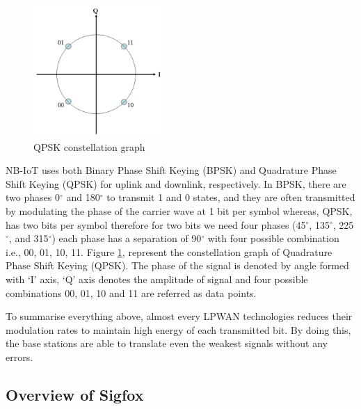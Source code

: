 \documentclass[12pt]{article}
\begin{document}
  \begin{figure}[H]
      \centering
      \includegraphics[width=0.5 \columnwidth, height=5cm, keepaspectratio
      ]{Images/QPSK.pdf}
      \caption{QPSK constellation graph}
      \label{fig:QPSK constellation graph}
  \end{figure}
  NB-IoT uses both Binary Phase Shift Keying (BPSK) and Quadrature Phase Shift Keying (QPSK) for uplink and downlink, respectively. In BPSK, there are two phases 0$^{\circ}$ and 180$^{\circ}$ to transmit 1 and 0 states, and they are often transmitted by modulating the phase of the carrier wave at 1 bit per symbol whereas, QPSK, has two bits per symbol therefore for two bits we need four phases (45$^{\circ}$, 135$^{\circ}$, 225$^{\circ}$, and 315$^{\circ}$) each phase has a separation of 90$^{\circ}$ with four possible combination i.e., 00, 01, 10, 11. Figure \ref{fig:QPSK constellation graph}, represent the constellation graph of Quadrature Phase Shift Keying (QPSK). The phase of the signal is denoted by angle formed with `I' axis, `Q' axis denotes the amplitude of signal and four possible combinations 00, 01, 10 and 11 are referred as data points.
  

   
 
 To summarise everything above, almost every LPWAN technologies reduces their modulation rates to maintain high energy of each transmitted bit. By doing this, the base stations are able to translate even the weakest signals without any errors.


\subsection{Overview of Sigfox}
\end{document}
